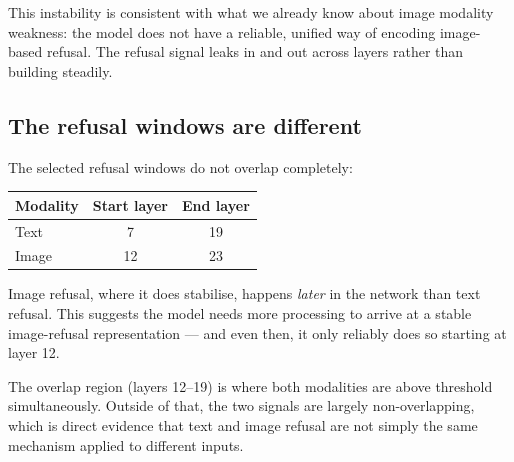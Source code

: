 \documentclass[11pt]{article}
\begin{document}
This instability is consistent with what we already know about image modality weakness: the model does not have a reliable, unified way of encoding image-based refusal. The refusal signal leaks in and out across layers rather than building steadily.

\subsection*{The refusal windows are different}

The selected refusal windows do not overlap completely:

\begin{center}
\begin{tabular}{lcc}
\toprule
Modality & Start layer & End layer \\
\midrule
Text & 7 & 19 \\
Image & 12 & 23 \\
\bottomrule
\end{tabular}
\end{center}

Image refusal, where it does stabilise, happens \textit{later} in the network than text refusal. This suggests the model needs more processing to arrive at a stable image-refusal representation — and even then, it only reliably does so starting at layer 12.

The overlap region (layers 12--19) is where both modalities are above threshold simultaneously. Outside of that, the two signals are largely non-overlapping, which is direct evidence that text and image refusal are not simply the same mechanism applied to different inputs.
\end{document}
